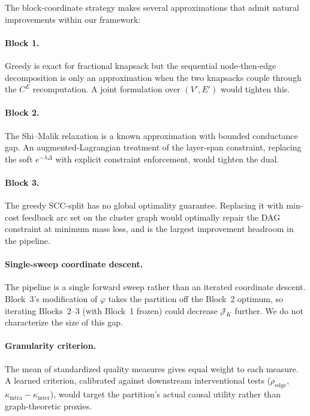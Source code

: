 \documentclass[table, 11pt]{article}
\begin{document}
The block-coordinate strategy makes several approximations that
admit natural improvements within our framework:

\paragraph{Block 1.} Greedy is exact for fractional knapsack but the
sequential node-then-edge decomposition is only an approximation when
the two knapsacks couple through the $C^E$ recomputation. A joint
formulation over $(V', E')$ would tighten this.

\paragraph{Block 2.} The Shi--Malik relaxation is a known
approximation with bounded conductance gap. An augmented-Lagrangian
treatment of the layer-span constraint, replacing the soft
$e^{-\lambda \Delta}$ with explicit constraint enforcement, would
tighten the dual.

\paragraph{Block 3.} The greedy SCC-split has no global optimality
guarantee. Replacing it with min-cost feedback arc set on the cluster
graph would optimally repair the DAG constraint at minimum mass loss,
and is the largest improvement headroom in the pipeline.

\paragraph{Single-sweep coordinate descent.}
The pipeline is a single forward sweep rather than an iterated
coordinate descent. Block~3's modification of $\varphi$ takes the
partition off the Block~2 optimum, so iterating Blocks~2--3 (with
Block~1 frozen) could decrease $\mathcal{J}_K$ further. We do not
characterize the size of this gap.

\paragraph{Granularity criterion.} The mean of standardized quality
measures gives equal weight to each measure. A learned criterion,
calibrated against downstream interventional tests
($\rho_{\text{edge}}$, $\kappa_{\text{intra}} - \kappa_{\text{inter}}$),
would target the partition's actual causal utility rather than
graph-theoretic proxies.
\end{document}
